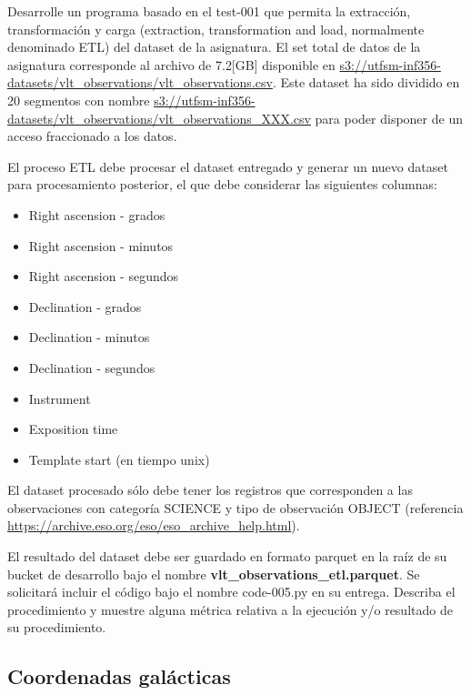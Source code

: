 \documentclass[12pt,letterpaper,twoside]{article}
\begin{document}
{\color{red} Desarrolle un programa basado en el test-001 que permita la extracción, transformación y carga (extraction, transformation and load, normalmente denominado ETL) del dataset de la asignatura. El set total de datos de la asignatura corresponde al archivo de 7.2[GB] disponible en \url{s3://utfsm-inf356-datasets/vlt_observations/vlt_observations.csv}. Este dataset ha sido dividido en 20 segmentos con nombre \url{s3://utfsm-inf356-datasets/vlt\_observations/vlt_observations_XXX.csv} para poder disponer de un acceso fraccionado a los datos.

    El proceso ETL debe procesar el dataset entregado y generar un nuevo dataset para procesamiento posterior, el que debe considerar las siguientes columnas:
    \begin{itemize}
        \item Right ascension - grados
        \item Right ascension - minutos
        \item Right ascension - segundos
        \item Declination - grados
        \item Declination - minutos
        \item Declination - segundos
        \item Instrument
        \item Exposition time
        \item Template start (en tiempo unix)
    \end{itemize}

    El dataset procesado sólo debe tener los registros que corresponden a las observaciones con categoría  SCIENCE y tipo de observación OBJECT (referencia \url{https://archive.eso.org/eso/eso_archive_help.html}).

    El resultado del dataset debe ser guardado en formato parquet en la raíz de su bucket de desarrollo bajo el nombre \textbf{vlt\_observations\_etl.parquet}. Se solicitará incluir el código bajo el nombre code-005.py en su entrega. Describa el procedimiento y muestre alguna métrica relativa a la ejecución y/o resultado de su procedimiento.}

\begin{code}[H]
    
\end{code}

\subsection{Coordenadas galácticas}
\end{document}
